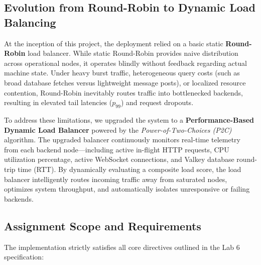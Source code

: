 \documentclass[12pt,a4paper]{article}
\begin{document}
\subsection{Evolution from Round-Robin to Dynamic Load Balancing}

At the inception of this project, the deployment relied on a basic static \textbf{Round-Robin} load balancer. While static Round-Robin provides naive distribution across operational nodes, it operates blindly without feedback regarding actual machine state. Under heavy burst traffic, heterogeneous query costs (such as broad database fetches versus lightweight message posts), or localized resource contention, Round-Robin inevitably routes traffic into bottlenecked backends, resulting in elevated tail latencies ($p_{99}$) and request dropouts.

To address these limitations, we upgraded the system to a \textbf{Performance-Based Dynamic Load Balancer} powered by the \emph{Power-of-Two-Choices (P2C)} algorithm. The upgraded balancer continuously monitors real-time telemetry from each backend node---including active in-flight HTTP requests, CPU utilization percentage, active WebSocket connections, and Valkey database round-trip time (RTT). By dynamically evaluating a composite load score, the load balancer intelligently routes incoming traffic away from saturated nodes, optimizes system throughput, and automatically isolates unresponsive or failing backends.

\subsection{Assignment Scope and Requirements}

The implementation strictly satisfies all core directives outlined in the Lab 6 specification:
\end{document}
